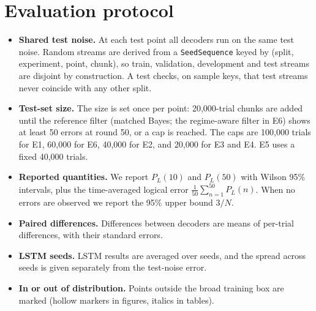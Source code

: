 \section{Evaluation protocol}\label{sec:protocol}
\begin{itemize}
  \item \textbf{Shared test noise.} At each test point all decoders run on
    the same test noise. Random streams are derived from a
    \texttt{SeedSequence} keyed by (split, experiment, point, chunk), so
    train, validation, development and test streams are disjoint by
    construction. A test checks, on sample keys, that test streams never
    coincide with any other split.
  \item \textbf{Test-set size.} The size is set once per point: 20{,}000-trial
    chunks are added until the reference filter (matched Bayes; the
    regime-aware filter in E6) shows at least 50 errors at round 50, or a cap
    is reached. The caps are 100{,}000 trials for E1, 60{,}000 for E6,
    40{,}000 for E2, and 20{,}000 for E3 and E4. E5 uses a fixed 40{,}000
    trials.
  \item \textbf{Reported quantities.} We report $P_L(10)$ and $P_L(50)$ with
    Wilson 95\% intervals, plus the time-averaged logical error
    $\frac1{50}\sum_{n=1}^{50}P_L(n)$. When no errors are observed we report
    the 95\% upper bound $3/N$.
  \item \textbf{Paired differences.} Differences between decoders are means
    of per-trial differences, with their standard errors.
  \item \textbf{LSTM seeds.} LSTM results are averaged over seeds, and the
    spread across seeds is given separately from the test-noise error.
  \item \textbf{In or out of distribution.} Points outside the broad training
    box are marked (hollow markers in figures, italics in tables).
\end{itemize}

